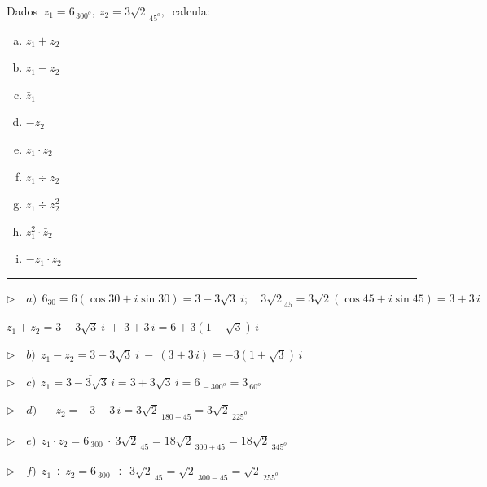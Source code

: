 \begin{miejercicio}

Dados $\ z_1=6_{\, 300^o},\ z_2=3\sqrt{2}_{\, 45^o},\ $ calcula:

\begin{multicols}{3}
\begin{enumerate}[a) ]
\item $z_1+z_2$
\item $z_1-z_2$
\item $\bar z_1$
\item $-z_2$
\item $z_1\cdot z_2$
\item $z_1 \div z_2$
\item $z_1\div z_2^2$	
\item $z_1^2\cdot \bar z_2$
\item $-z_1\cdot z_2$
\end{enumerate}
	
\end{multicols}


\rule{250pt}{0.1pt}

\vspace{4mm} $\triangleright \quad a)\ \ 6_{30}=6(\cos 30+i\sin 30)=3-3\sqrt{3}\ i;\quad 3\sqrt{2}_{45}=3\sqrt{2}(\cos 45+i\sin 45)=3+3 \, i$

\vspace{2mm} $z_1+z_2=3-3\sqrt{3}\ i \ + \ 3+3 \, i=6+3(1-\sqrt{3})\, i $

\vspace{6mm} $\triangleright \quad b)\ \ z_1-z_2=3-3\sqrt{3}\ i \ - \ (3+3 \, i)=-3(1+\sqrt{3})\, i$


\vspace{6mm} $\triangleright \quad c)\ \ \bar z_1=\overline{3-3\sqrt{3}\, i}=3+3\sqrt{3}\, i=6_{\, -300^o}=3_{\ 60^o}$

\vspace{2mm}

\vspace{6mm} $\triangleright \quad d)\ \ -z_2=-3-3\, i= 3\sqrt{2}_{\ 180+45}= 3\sqrt{2}_{\ 225^o}$

\vspace{2mm}

\vspace{6mm} $\triangleright \quad e)\ \ z_1\cdot z_2=6_{\ 300} \ \cdot \  3\sqrt{2}_{\ 45}=18\sqrt{2}_{\ 300+45}=18\sqrt{2}_{\ 345^o}$



\vspace{6mm} $\triangleright \quad f)\ \ z_1 \div z_2= 6_{\ 300} \ \div \  3\sqrt{2}_{\ 45}=\sqrt{2}_{\ 300-45}=\sqrt{2}_{\ 255^o}$




\end{miejercicio}
